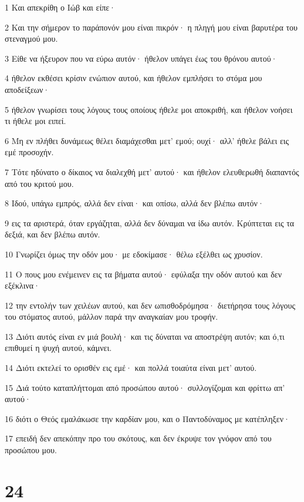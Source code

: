 \par 1 Και απεκρίθη ο Ιώβ και είπε·
\par 2 Και την σήμερον το παράπονόν μου είναι πικρόν· η πληγή μου είναι βαρυτέρα του στεναγμού μου.
\par 3 Είθε να ήξευρον που να εύρω αυτόν· ήθελον υπάγει έως του θρόνου αυτού·
\par 4 ήθελον εκθέσει κρίσιν ενώπιον αυτού, και ήθελον εμπλήσει το στόμα μου αποδείξεων·
\par 5 ήθελον γνωρίσει τους λόγους τους οποίους ήθελε μοι αποκριθή, και ήθελον νοήσει τι ήθελε μοι ειπεί.
\par 6 Μη εν πλήθει δυνάμεως θέλει διαμάχεσθαι μετ' εμού; ουχί· αλλ' ήθελε βάλει εις εμέ προσοχήν.
\par 7 Τότε ηδύνατο ο δίκαιος να διαλεχθή μετ' αυτού· και ήθελον ελευθερωθή διαπαντός από του κριτού μου.
\par 8 Ιδού, υπάγω εμπρός, αλλά δεν είναι· και οπίσω, αλλά δεν βλέπω αυτόν·
\par 9 εις τα αριστερά, όταν εργάζηται, αλλά δεν δύναμαι να ίδω αυτόν. Κρύπτεται εις τα δεξιά, και δεν βλέπω αυτόν.
\par 10 Γνωρίζει όμως την οδόν μου· με εδοκίμασε· θέλω εξέλθει ως χρυσίον.
\par 11 Ο πους μου ενέμεινεν εις τα βήματα αυτού· εφύλαξα την οδόν αυτού και δεν εξέκλινα·
\par 12 την εντολήν των χειλέων αυτού, και δεν ωπισθοδρόμησα· διετήρησα τους λόγους του στόματος αυτού, μάλλον παρά την αναγκαίαν μου τροφήν.
\par 13 Διότι αυτός είναι εν μιά βουλή· και τις δύναται να αποστρέψη αυτόν; και ό,τι επιθυμεί η ψυχή αυτού, κάμνει.
\par 14 Διότι εκτελεί το ορισθέν εις εμέ· και πολλά τοιαύτα είναι μετ' αυτού.
\par 15 Διά τούτο καταπλήττομαι από προσώπου αυτού· συλλογίζομαι και φρίττω απ' αυτού·
\par 16 διότι ο Θεός εμαλάκωσε την καρδίαν μου, και ο Παντοδύναμος με κατέπληξεν·
\par 17 επειδή δεν απεκόπην προ του σκότους, και δεν έκρυψε τον γνόφον από του προσώπου μου.

\chapter{24}


